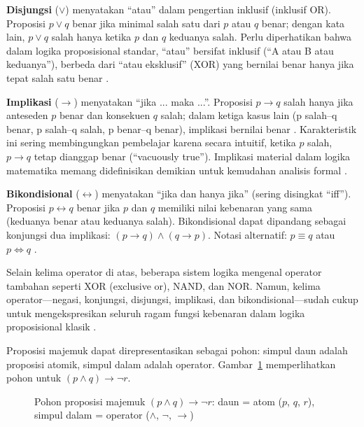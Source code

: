 \textbf{Disjungsi} ($\vee$) menyatakan ``atau'' dalam pengertian inklusif (inklusif OR). Proposisi $p \vee q$ benar jika minimal salah satu dari $p$ atau $q$ benar; dengan kata lain, $p \vee q$ salah hanya ketika $p$ dan $q$ keduanya salah. Perlu diperhatikan bahwa dalam logika proposisional standar, ``atau'' bersifat inklusif (``A atau B atau keduanya''), berbeda dari ``atau eksklusif'' (XOR) yang bernilai benar hanya jika tepat salah satu benar \cite{rosen2019,berkeley_logic}.

\textbf{Implikasi} ($\rightarrow$) menyatakan ``jika ... maka ...''. Proposisi $p \rightarrow q$ salah hanya jika anteseden $p$ benar dan konsekuen $q$ salah; dalam ketiga kasus lain (p salah–q benar, p salah–q salah, p benar–q benar), implikasi bernilai benar \cite{forallx}. Karakteristik ini sering membingungkan pembelajar karena secara intuitif, ketika $p$ salah, $p \rightarrow q$ tetap dianggap benar (``vacuously true''). Implikasi material dalam logika matematika memang didefinisikan demikian untuk kemudahan analisis formal \cite{brilliant_truthtables,libretexts_logic}.

\textbf{Bikondisional} ($\leftrightarrow$) menyatakan ``jika dan hanya jika'' (sering disingkat ``iff''). Proposisi $p \leftrightarrow q$ benar jika $p$ dan $q$ memiliki nilai kebenaran yang sama (keduanya benar atau keduanya salah). Bikondisional dapat dipandang sebagai konjungsi dua implikasi: $(p \rightarrow q) \wedge (q \rightarrow p)$. Notasi alternatif: $p \equiv q$ atau $p \Leftrightarrow q$ \cite{wiki_proplogic,levin_discrete}.

Selain kelima operator di atas, beberapa sistem logika mengenal operator tambahan seperti XOR (exclusive or), NAND, dan NOR. Namun, kelima operator---negasi, konjungsi, disjungsi, implikasi, dan bikondisional---sudah cukup untuk mengekspresikan seluruh ragam fungsi kebenaran dalam logika proposisional klasik \cite{rosen2019,copi2014}.

Proposisi majemuk dapat direpresentasikan sebagai pohon: simpul daun adalah proposisi atomik, simpul dalam adalah operator. Gambar~\ref{fig:pohon-proposisi} memperlihatkan pohon untuk $(p \wedge q) \rightarrow \neg r$.

\begin{figure}[htbp]
\centering
{}
\caption{Pohon proposisi majemuk $(p \wedge q) \rightarrow \neg r$: daun = atom ($p$, $q$, $r$), simpul dalam = operator ($\wedge$, $\neg$, $\rightarrow$)}
\label{fig:pohon-proposisi}
\end{figure}

